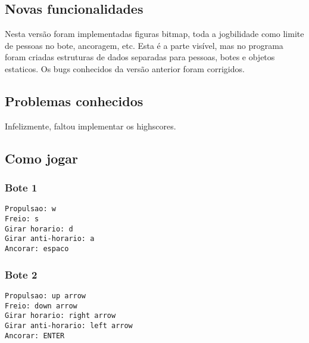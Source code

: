 \documentclass[a4paper,12pt]{article}
\begin{document}
\subsection{Novas funcionalidades}
Nesta vers\~ao foram implementadas figuras bitmap, toda a jogbilidade como limite de pessoas no bote, ancoragem, etc.
Esta \'e a parte vis\'ivel, mas no programa foram criadas estruturas de dados separadas para pessoas, botes e objetos estaticos. Os bugs conhecidos da vers\~ao anterior foram corrigidos.

\subsection{Problemas conhecidos}
Infelizmente, faltou implementar os highscores.

\subsection{Como jogar}
\subsubsection{Bote 1}
\begin{verbatim}
Propulsao: w
Freio: s
Girar horario: d
Girar anti-horario: a
Ancorar: espaco
\end{verbatim}
\subsubsection{Bote 2}
\begin{verbatim}
Propulsao: up arrow
Freio: down arrow
Girar horario: right arrow
Girar anti-horario: left arrow
Ancorar: ENTER
\end{verbatim}
\end{document}
